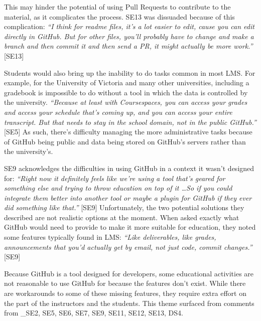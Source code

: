 This may hinder the potential of using Pull Requests to contribute to the material, as it complicates the process. SE13 was dissuaded because of this complication: \textit{``I think for readme files, it's a lot easier to edit, cause you can edit directly in GitHub. But for other files, you'll probably have to change and make a branch and then commit it and then send a PR, it might actually be more work.''} [SE13]

Students would also bring up the inability to do tasks common in most LMS. For example, for the University of Victoria and many other universities, including a gradebook is impossible to do without a tool in which the data is controlled by the university. \textit{``Because at least with Coursespaces, you can access your grades and access your schedule that's coming up, and you can access your entire transcript. But that needs to stay in the school domain, not in the public GitHub.''} [SE5] As such, there's difficulty managing the more administrative tasks because of GitHub being public and data being stored on GitHub's servers rather than the university's.


SE9 acknowledges the difficulties in using GitHub in a context it wasn't designed for: \textit{``Right now it definitely feels like we're using a tool that's geared for something else and trying to throw education on top of it \ldots So if you could integrate them better into another tool or maybe a plugin for GitHub if they ever did something like that.''} [SE9] Unfortunately, the two potential solutions they described are not realistic options at the moment. When asked exactly what GitHub would need to provide to make it more suitable for education, they noted some features typically found in LMS: \textit{``Like deliverables, like grades, announcements that you'd actually get by email, not just code, commit changes.''} [SE9]

Because GitHub is a tool designed for developers, some educational activities are not reasonable to use GitHub for because the features don't exist. While there are workarounds to some of these missing features, they require extra effort on the part of the instructors and the students. This theme surfaced from comments from _{SE2, SE5, SE6, SE7, SE9, SE11, SE12, SE13, DS4}.

